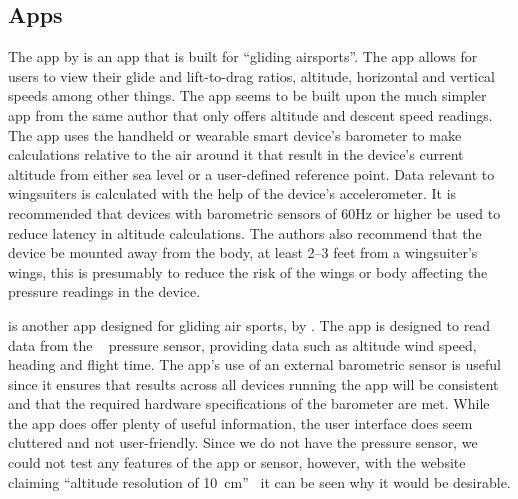 \documentclass[11pt, a4paper, twocolumn]{article}
\begin{document}
\subsection{Apps}\label{sec:apps} %

The  app by \textcite{pfm_technologies_llc_l/d_2015} is an app that is built for ``gliding airsports''. The app allows for users to view their glide and lift-to-drag ratios, altitude, horizontal and vertical speeds among other things. The app seems to be built upon the much simpler  app from the same author that only offers altitude and descent speed readings.
The  app uses the handheld or wearable smart device's barometer to make calculations relative to the air around it that result in the device's current altitude from either sea level or a user-defined reference point. Data relevant to wingsuiters is calculated with the help of the device's accelerometer. It is recommended that devices with barometric sensors of 60Hz or higher be used to reduce latency in altitude calculations. The authors also recommend that the device be mounted away from the body, at least 2--3 feet from a wingsuiter's wings, this is presumably to reduce the risk of the wings or body affecting the pressure readings in the device.

 is another app designed for gliding air sports, by \textcite{dickie_blueflyvario_2016}. The app is designed to read data from the ~\cite{noauthor_blueflyvario_nodate} pressure sensor, providing data such as altitude wind speed, heading and flight time.
The app's use of an external barometric sensor is useful since it ensures that results across all devices running the app will be consistent and that the required hardware specifications of the barometer are met.
While the app does offer plenty of useful information, the user interface does seem cluttered and not user-friendly. Since we do not have the  pressure sensor, we could not test any features of the app or sensor, however, with the website claiming ``altitude resolution of \SI{10}{\centi\metre}''~\cite{noauthor_blueflyvario_nodate} it can be seen why it would be desirable.
\end{document}
